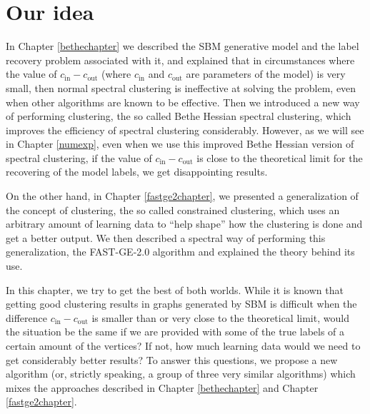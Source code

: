 \section{Our idea}
In Chapter \ref{bethechapter} we described the SBM generative model and the label recovery problem associated with it, and explained that in circumstances where the value of $c_\text{in} - c_\text{out}$ (where $c_\text{in}$ and $c_\text{out}$ are parameters of the model) is very small, then normal spectral clustering is ineffective at solving the problem, even when other algorithms are known to be effective.
Then we introduced a new way of performing clustering, the so called Bethe Hessian spectral clustering, which improves the efficiency of spectral clustering considerably. 
However, as we will see in Chapter \ref{numexp}, even when we use this improved Bethe Hessian version of spectral clustering, if the value of $c_\text{in} - c_\text{out}$ is close to the theoretical limit for the recovering of the model labels, we get disappointing results.

On the other hand, in Chapter \ref{fastge2chapter}, we presented a generalization of the concept of clustering, the so called constrained clustering, which uses an arbitrary amount of learning data to ``help shape'' how the clustering is done and get a better output.
We then described a spectral way of performing this generalization, the FAST-GE-2.0 algorithm and explained the theory behind its use.

In this chapter, we try to get the best of both worlds. 
While it is known that getting good clustering results in graphs generated by SBM is difficult when the difference $c_\text{in} - c_\text{out}$ is smaller than or very close to the theoretical limit, would the situation be the same if we are provided with some of the true labels of a certain amount of the vertices? If not, how much learning data would we need to get considerably better results?
To answer this questions, we propose a new algorithm (or, strictly speaking, a group of three very similar algorithms) which mixes the approaches described in Chapter \ref{bethechapter} and Chapter \ref{fastge2chapter}.

